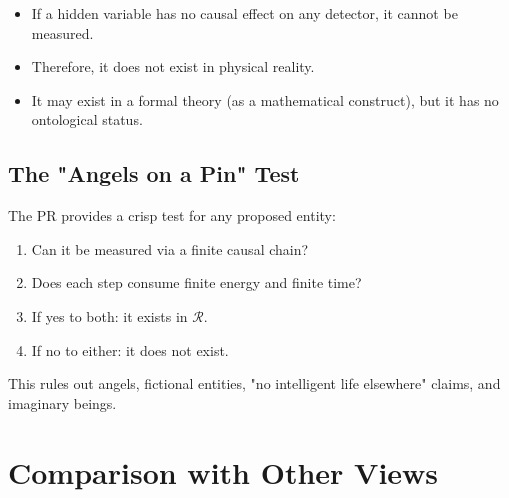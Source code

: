 \documentclass[aps,preprint,showpacs,showkeys]{revtex4}
\begin{document}
\begin{itemize}
\item If a hidden variable has no causal effect on any detector, it cannot
be measured.

\item Therefore, it does not exist in physical reality.

\item It may exist in a formal theory (as a mathematical construct), but it
has no ontological status.
\end{itemize}

\subsection{The "Angels on a Pin" Test}

The PR provides a crisp test for any proposed entity:

\begin{enumerate}
\item Can it be measured via a finite causal chain?

\item Does each step consume finite energy and finite time?

\item If yes to both: it exists in $\mathcal{R}$.

\item If no to either: it does not exist.
\end{enumerate}

This rules out angels, fictional entities, "no intelligent life elsewhere"
claims, and imaginary beings.

\section{Comparison with Other Views}
\end{document}
